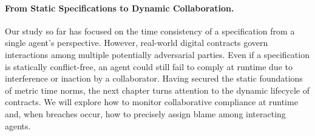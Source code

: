 \paragraph{From Static Specifications to Dynamic Collaboration.} 

Our study so far has focused on the time consistency of a specification from a single agent's perspective. However, real-world digital contracts govern interactions among multiple potentially adversarial parties. Even if a specification is statically conflict-free, an agent could still fail to comply at runtime due to interference or inaction by a collaborator. Having secured the static foundations of metric time norms, the next chapter turns attention to the dynamic lifecycle of contracts. We will explore how to monitor collaborative compliance at runtime and, when breaches occur, how to precisely assign blame among interacting agents.

















